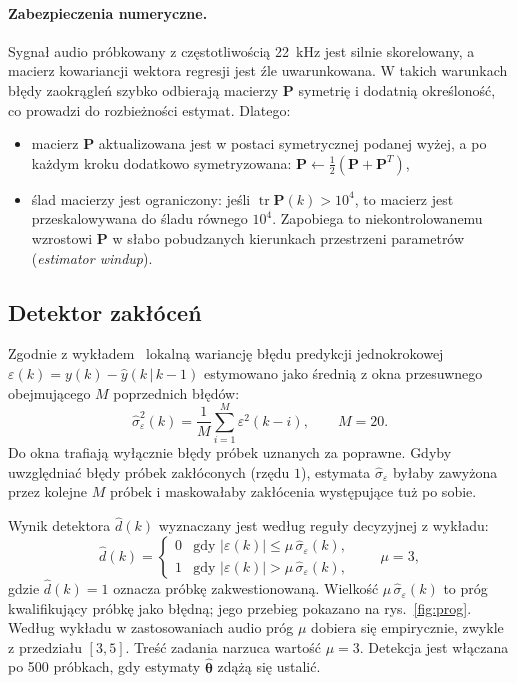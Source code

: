 \documentclass[11pt,a4paper]{article}
\begin{document}
\paragraph{Zabezpieczenia numeryczne.}
Sygnał audio próbkowany z częstotliwością 22~kHz jest silnie skorelowany,
a macierz kowariancji wektora regresji jest źle uwarunkowana. W takich
warunkach błędy zaokrągleń szybko odbierają macierzy $\mathbf{P}$ symetrię
i dodatnią określoność, co prowadzi do rozbieżności estymat. Dlatego:
\begin{itemize}
  \item macierz $\mathbf{P}$ aktualizowana jest w postaci symetrycznej
        podanej wyżej, a po każdym kroku dodatkowo symetryzowana:
        $\mathbf{P} \leftarrow \tfrac12(\mathbf{P}+\mathbf{P}^T)$,
  \item ślad macierzy jest ograniczony: jeśli
        $\operatorname{tr}\mathbf{P}(k) > 10^4$, to macierz jest
        przeskalowywana do śladu równego $10^4$. Zapobiega to
        niekontrolowanemu wzrostowi $\mathbf{P}$ w słabo pobudzanych
        kierunkach przestrzeni parametrów (\emph{estimator windup}).
\end{itemize}

\subsection{Detektor zakłóceń}
\label{sec:detektor}

Zgodnie z wykładem~\cite{wyklad} lokalną wariancję błędu predykcji
jednokrokowej $\varepsilon(k) = y(k) - \hat y(k\,|\,k-1)$ estymowano jako
średnią z okna przesuwnego obejmującego $M$ poprzednich błędów:
\begin{equation}
  \hat\sigma^2_\varepsilon(k) = \frac{1}{M}\sum_{i=1}^{M} \varepsilon^2(k-i),
  \qquad M = 20 .
\end{equation}
Do okna trafiają wyłącznie błędy próbek uznanych za poprawne. Gdyby
uwzględniać błędy próbek zakłóconych (rzędu $1$), estymata
$\hat\sigma_\varepsilon$ byłaby zawyżona przez kolejne $M$ próbek
i maskowałaby zakłócenia występujące tuż po sobie.

Wynik detektora $\hat d(k)$ wyznaczany jest według reguły decyzyjnej
z wykładu:
\begin{equation}
  \hat d(k) =
  \begin{cases}
    0 & \text{gdy } |\varepsilon(k)| \le \mu\,\hat\sigma_\varepsilon(k), \\
    1 & \text{gdy } |\varepsilon(k)| > \mu\,\hat\sigma_\varepsilon(k),
  \end{cases}
  \qquad \mu = 3 ,
  \label{eq:det}
\end{equation}
gdzie $\hat d(k)=1$ oznacza próbkę zakwestionowaną. Wielkość
$\mu\,\hat\sigma_\varepsilon(k)$ to próg kwalifikujący próbkę jako błędną;
jego przebieg pokazano na rys.~\ref{fig:prog}. Według wykładu
w zastosowaniach audio próg $\mu$ dobiera się empirycznie, zwykle
z przedziału $[3, 5]$. Treść zadania narzuca wartość $\mu = 3$. Detekcja
jest włączana po 500 próbkach, gdy estymaty $\hat{\boldsymbol\theta}$ zdążą
się ustalić.
\end{document}
